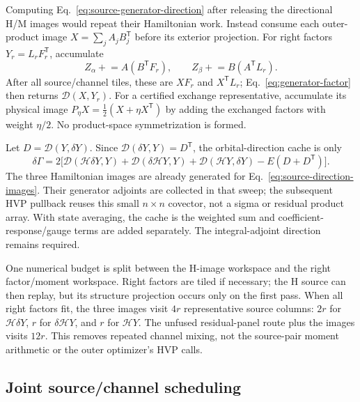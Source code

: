\documentclass[11pt,a4paper]{article}
\newcommand{\Tr}{^{\mathsf T}}
\newcommand{\Ha}{\mathcal H}
\begin{document}
Computing Eq.~\eqref{eq:source-generator-direction} after releasing the
directional H/M images would repeat their Hamiltonian work. Instead consume
each outer-product image $X=\sum_j A_jB_j\Tr$ before its exterior projection.
For right factors $Y_r=L_rF_r\Tr$, accumulate
\begin{equation}
 Z_\alpha\mathrel{+}=A(B\Tr F_r),\qquad
 Z_\beta\mathrel{+}=B(A\Tr L_r).
\end{equation}
After all source/channel tiles, these are $XF_r$ and $X\Tr L_r$;
Eq.~\eqref{eq:generator-factor} then returns $\mathcal D(X,Y_r)$.
For a certified exchange representative, accumulate its physical image
$P_\eta X=\tfrac12(X+\eta X\Tr)$ by adding the exchanged factors with
weight $\eta/2$. No product-space symmetrization is formed.

Let $D=\mathcal D(Y,\delta Y)$. Since
$\mathcal D(\delta Y,Y)=D\Tr$, the orbital-direction cache is only
\begin{equation}
 \delta\Gamma=2\bigl[
     \mathcal D(\Ha\delta Y,Y)+\mathcal D(\delta\Ha Y,Y)
    +\mathcal D(\Ha Y,\delta Y)-E(D+D\Tr)\bigr].
\end{equation}
The three Hamiltonian images are already generated for
Eq.~\eqref{eq:source-direction-images}. Their generator adjoints are
collected in that sweep; the subsequent HVP pullback reuses this small
$n\times n$ covector, not a sigma or residual product array. With state
averaging, the cache is the weighted sum and coefficient-response/gauge
terms are added separately. The integral-adjoint direction remains required.

One numerical budget is split between the H-image workspace and the right
factor/moment workspace. Right factors are tiled if necessary; the H source
can then replay, but its structure projection occurs only on the first pass.
When all right factors fit, the three images visit $4r$ representative source
columns: $2r$ for $\Ha\delta Y$, $r$ for $\delta\Ha Y$, and $r$ for
$\Ha Y$. The unfused residual-panel route plus the images visits $12r$.
This removes repeated channel mixing, not the source-pair moment arithmetic
or the outer optimizer's HVP calls.

\subsection{Joint source/channel scheduling}\label{sec:factor-schedule}
\end{document}
